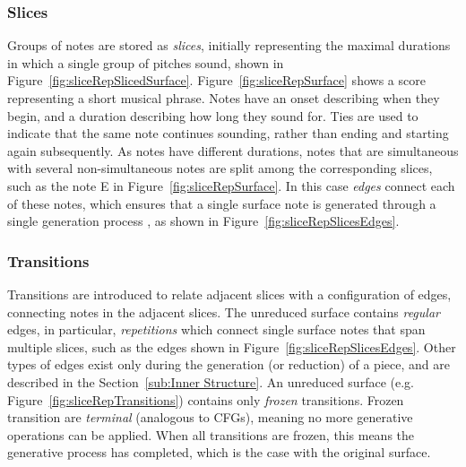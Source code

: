 \documentclass[12pt,a4paper,twoside,openany]{report} \usepackage[pdfborder={0 0 0}]{hyperref}    %
\theoremstyle{definition} \newtheorem{definition}{Definition}[section]
\begin{document}
\subsubsection{Slices}
\label{sub:slicesPV}

Groups of notes are stored as \textit{slices}, initially representing the maximal durations in which a single group of pitches sound, shown in Figure~\ref{fig:sliceRepSlicedSurface}.
Figure~\ref{fig:sliceRepSurface} shows a score representing a short musical phrase. 
Notes have an onset describing when they begin, and a duration describing how long they sound for. 
Ties are used to indicate that the same note continues sounding, rather than ending and starting again subsequently. 
As notes have different durations, notes that are simultaneous with several non-simultaneous notes are split among the corresponding slices, such as the note E in Figure~\ref{fig:sliceRepSurface}.
In this case \textit{edges} connect each of these notes, which ensures that a single surface note is generated through a single generation process \cite{finkensiepModelingInferringProtovoice2021}, as shown in Figure~\ref{fig:sliceRepSlicesEdges}. 


\subsubsection{Transitions}
\label{sub:transitions}
Transitions are introduced to relate adjacent slices with a configuration of edges, connecting notes in the adjacent
slices. 
The unreduced surface contains \textit{regular} edges, in particular, \textit{repetitions} which connect single surface notes that span multiple slices, such as the edges shown in Figure~\ref{fig:sliceRepSlicesEdges}. 
Other types of edges exist only during the generation (or reduction) of a piece, and are described in the Section~\ref{sub:Inner Structure}. 
An unreduced surface (e.g. Figure~\ref{fig:sliceRepTransitions}) contains only \textit{frozen} transitions.
Frozen transition are \textit{terminal} (analogous to CFGs), meaning no more generative operations can be applied.
When all transitions are frozen, this means the generative process has completed, which is the case with the
original surface.
\end{document}
